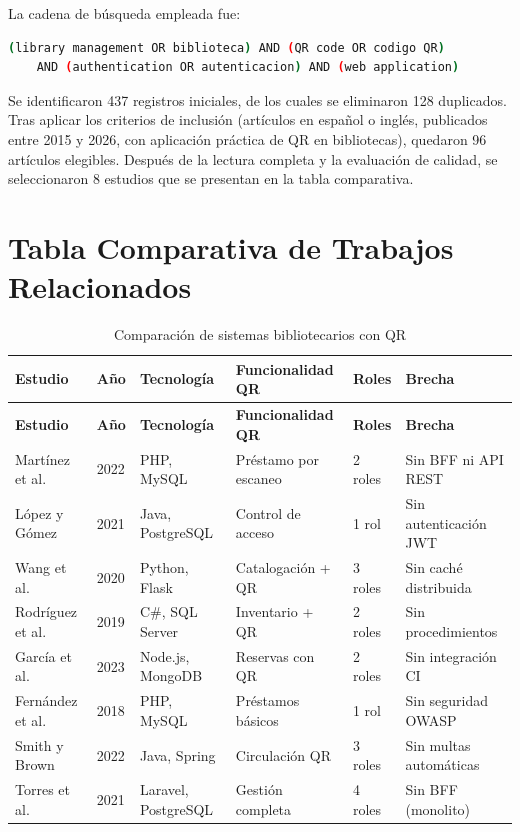\documentclass[
11pt,
a4paper,
]{report}
\begin{document}
	La cadena de búsqueda empleada fue:
	
	\begin{lstlisting}[language=bash]
	(library management OR biblioteca) AND (QR code OR codigo QR)
	AND (authentication OR autenticacion) AND (web application)
	\end{lstlisting}
	
	Se identificaron 437 registros iniciales, de los cuales se eliminaron 128 duplicados. Tras aplicar los criterios de inclusión (artículos en español o inglés, publicados entre 2015 y 2026, con aplicación práctica de QR en bibliotecas), quedaron 96 artículos elegibles. Después de la lectura completa y la evaluación de calidad, se seleccionaron 8 estudios que se presentan en la tabla comparativa.
	
	\hypertarget{tabla-comparativa}{%
		\section{Tabla Comparativa de Trabajos Relacionados}\label{tabla-comparativa}}
	
	\begin{longtable}{p{2.0cm}p{2.5cm}p{2.5cm}p{2.5cm}p{2.5cm}p{2.5cm}}
		\caption{Comparación de sistemas bibliotecarios con QR}\\
		\toprule
		\textbf{Estudio} & \textbf{Año} & \textbf{Tecnología} & \textbf{Funcionalidad QR} & \textbf{Roles} & \textbf{Brecha} \\
		\midrule
		\endfirsthead
		\toprule
		\textbf{Estudio} & \textbf{Año} & \textbf{Tecnología} & \textbf{Funcionalidad QR} & \textbf{Roles} & \textbf{Brecha} \\
		\midrule
		\endhead
		\bottomrule
		\endfoot
		\bottomrule
		\endlastfoot
		Martínez et al. & 2022 & PHP, MySQL & Préstamo por escaneo & 2 roles & Sin BFF ni API REST \\
		López y Gómez & 2021 & Java, PostgreSQL & Control de acceso & 1 rol & Sin autenticación JWT \\
		Wang et al. & 2020 & Python, Flask & Catalogación + QR & 3 roles & Sin caché distribuida \\
		Rodríguez et al. & 2019 & C\#, SQL Server & Inventario + QR & 2 roles & Sin procedimientos \\     
		García et al. & 2023 & Node.js, MongoDB & Reservas con QR & 2 roles & Sin integración CI \\
		Fernández et al. & 2018 & PHP, MySQL & Préstamos básicos & 1 rol & Sin seguridad OWASP \\
		Smith y Brown & 2022 & Java, Spring & Circulación QR & 3 roles & Sin multas automáticas \\
		Torres et al. & 2021 & Laravel, PostgreSQL & Gestión completa & 4 roles & Sin BFF (monolito) \\
		\bottomrule
	\end{longtable}
	
\end{document}

